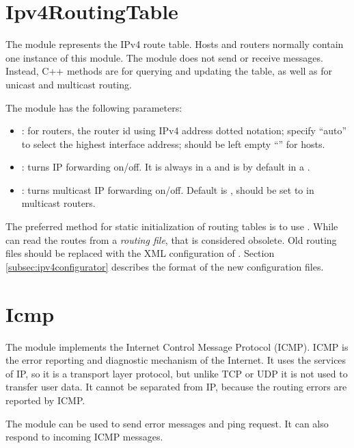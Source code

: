 \section{Ipv4RoutingTable}

The  module represents the IPv4 route table.
Hosts and routers normally contain one instance of this module.
The  module does not send or receive messages.
Instead, C++ methods are for querying and updating the table, as well as for
unicast and multicast routing.

The  module has the following parameters:

\begin{itemize}
  \item {}: for routers, the router id using IPv4 address dotted notation;
      specify ``auto'' to select the highest interface address; should be left empty ``''
      for hosts.
  \item {}: turns IP forwarding on/off. It is always 
      in a  and is  by default in a .
  \item {}: turns multicast IP forwarding on/off. 
    Default is , should be set to  in multicast routers.
\end{itemize}

The preferred method for static initialization of routing tables is to use
. While 
can read the routes from a \textit{routing file}, that is considered obsolete.
Old routing files should be replaced with the XML configuration of
. Section \ref{subsec:ipv4configurator}
describes the format of the new configuration files.


\section{Icmp}

The  module implements the Internet Control Message Protocol
(ICMP). ICMP is the error reporting and diagnostic mechanism of the Internet.
It uses the services of IP, so it is a transport layer protocol, but unlike TCP
or UDP it is not used to transfer user data. It cannot be separated from
IP, because the routing errors are reported by ICMP.

The  module can be used to send error messages and ping
request. It can also respond to incoming ICMP messages.

